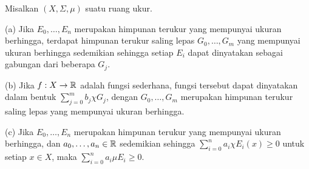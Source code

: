  Misalkan $(X,\Sigma,\mu)$ suatu ruang ukur.

(a) Jika $E_0,\ldots,E_n$ merupakan himpunan terukur yang mempunyai ukuran berhingga,
terdapat himpunan terukur saling lepas $G_0,\ldots,G_m$ yang mempunyai ukuran berhingga
sedemikian sehingga setiap $E_i$ dapat dinyatakan sebagai gabungan dari beberapa $G_j$.

(b) Jika $f:X\to\Bbb R$ adalah fungsi sederhana, fungsi tersebut dapat dinyatakan dalam
bentuk $\sum_{j=0}^mb_j\chi G_j$, dengan $G_0,\ldots,G_m$ merupakan himpunan
terukur saling lepas yang mempunyai ukuran berhingga.

(c) Jika $E_0,\ldots,E_n$ merupakan himpunan terukur yang mempunyai ukuran berhingga, dan
$a_0,\ldots,a_n\in\Bbb R$ sedemikian sehingga $\sum_{i=0}^na_i\chi E_i(x)\ge
0$ untuk setiap $x\in X$, maka $\sum_{i=0}^na_i\mu E_i\ge 0$.

